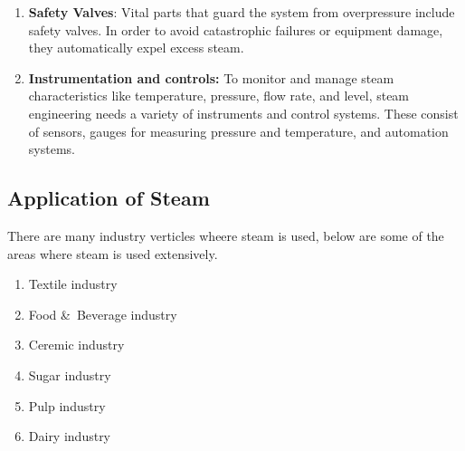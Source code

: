 \begin{enumerate}
    \item \textbf{Safety Valves}: Vital parts that guard the system from overpressure include safety valves. In order to avoid catastrophic failures or equipment damage, they automatically expel excess steam.
    \item \textbf{Instrumentation and controls:} To monitor and manage steam characteristics like temperature, pressure, flow rate, and level, steam engineering needs a variety of instruments and control systems. These consist of sensors, gauges for measuring pressure and temperature, and automation systems. 
\end{enumerate} 


\subsection{Application of Steam}
There are many industry verticles wheere steam is used, below are some of the areas where steam is used extensively.
\begin{enumerate}
    \item Textile industry
    \item Food \&\ Beverage industry
    \item Ceremic industry
    \item Sugar industry
    \item Pulp industry
    \item Dairy industry
\end{enumerate}